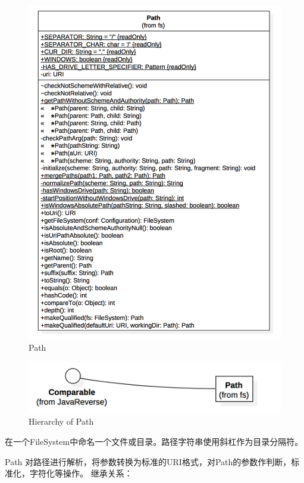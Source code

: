 \begin{figure}[h]
\centering
\includegraphics[width =1\linewidth]{6.png}
\caption{Path}
\label{fig:Path}
\end{figure}

\begin{figure}[h]
\centering
\includegraphics[width =1\linewidth]{7.png}
\caption{Hierarchy of Path}
\label{fig:Hierarchy of Path}
\end{figure}

在一个FileSystem中命名一个文件或目录。路径字符串使用斜杠作为目录分隔符。

Path 对路径进行解析，将参数转换为标准的URI格式，对Path的参数作判断，标准化，字符化等操作。
继承关系：

